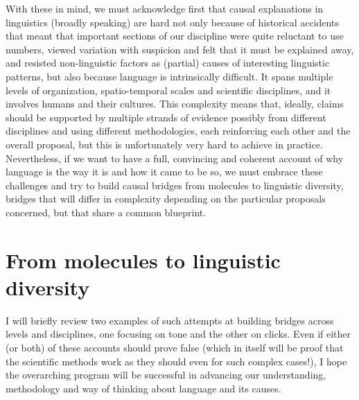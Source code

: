\documentclass[output=paper]{langsci/langscibook}
\begin{document}
With these in mind, we must acknowledge first that causal explanations in linguistics (broadly speaking) are hard not only because of historical accidents that meant that important sections of our discipline were quite reluctant to use numbers, viewed variation with suspicion and felt that it must be explained away, and resisted non-linguistic factors as (partial) causes of interesting linguistic patterns, but also because language is intrinsically difficult. It spans multiple levels of organization, spatio-temporal scales and scientific disciplines, and it involves humans and their cultures. This complexity means that, ideally, claims should be supported by multiple strands of evidence possibly from different disciplines and using different methodologies, each reinforcing each other and the overall proposal, but this is unfortunately very hard to achieve in practice. Nevertheless, if we want to have a full, convincing and coherent account of why language is the way it is and how it came to be so, we must embrace these challenges and try to build causal bridges from molecules to linguistic diversity, bridges that will differ in complexity depending on the particular proposals concerned, but that share a common blueprint.

\section{From molecules to linguistic diversity}

I will briefly review two examples of such attempts at building bridges across levels and disciplines, one focusing on tone and the other on clicks. Even if either (or both) of these accounts should prove false (which in itself will be proof that the scientific methods work as they should even for such complex cases!), I hope the overarching program will be successful in advancing our understanding, methodology and way of thinking about language and its causes.
\end{document}
